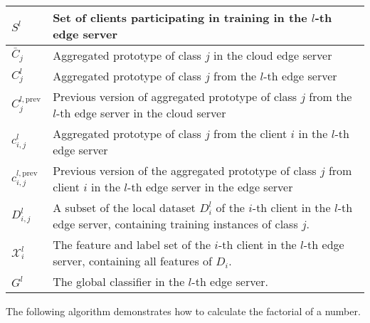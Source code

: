 \documentclass[journal]{IEEEtran}
\begin{document}
\begin{table}[H]
\begin{tabular}{|@{}m{1cm}<{\centering}|m{6.5cm}|}
    \( S^{l} \)                           & Set of clients participating in training in the \( l \)-th edge server                                                                \\
    \hline
    \( \bar{C}_j \)                       & Aggregated prototype of class $j$ in the cloud edge server                                                                            \\
    \hline
    \( C^l_j \)                           & Aggregated prototype of class $j$ from the \( l \)-th edge server                                                                     \\
    \hline
    \( C^{l,\text{prev}}_j \)              & Previous version of aggregated prototype of class $j$ from the \( l \)-th edge server in the cloud server                          \\
    \hline
    \( c^l_{i, j} \)                      & Aggregated prototype of class $j$ from the client \(i\) in  the \( l \)-th edge server                                                \\
    \hline
    \( c_{i, j}^{l, \text{prev}} \)        & Previous version of the aggregated prototype of class \( j \) from client \( i \) in the \( l \)-th edge server in the edge server \\
    \hline
    \( D^l_{i,j} \)                         & A subset of the local dataset \(D^l_i\) of the $i$-th client in the $l$-th edge server, containing training instances of class $j$.                               \\
    \hline
    \( \mathcal{X}^l_i \) & The feature and label set of the $i$-th client in the $l$-th edge server, containing all features of $D_i$. \\
    \hline
    \( G^l \) & The global classifier in the $l$-th edge server. \\
    \hline
  \end{tabular}
\end{table}

The following algorithm demonstrates how to calculate the factorial of a number.
\end{document}
